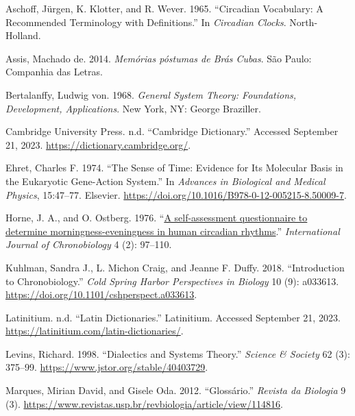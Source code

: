 \documentclass[
  12pt,
  a4paper,
  oneside]{tesesusp}
\newlength{\cslhangindent}
\newlength{\cslentryspacingunit} %
\newenvironment{CSLReferences}[2] %
 {%
  \setlength{\parindent}{0pt}
  \ifodd #1
  \let\oldpar\par
  \def\par{\hangindent=\cslhangindent\oldpar}
  \fi
  \setlength{\parskip}{#2\cslentryspacingunit}
 }%
 {}
\begin{document}
\hypertarget{refs}{}
\begin{CSLReferences}{1}{0}
\leavevmode{}%
Aschoff, Jürgen, K. Klotter, and R. Wever. 1965. {``Circadian
Vocabulary: A Recommended Terminology with Definitions.''} In
\emph{Circadian Clocks}. North-Holland.

\leavevmode{}%
Assis, Machado de. 2014. \emph{Memórias póstumas de Brás Cubas}. São
Paulo: Companhia das Letras.

\leavevmode{}%
Bertalanffy, Ludwig von. 1968. \emph{General System Theory: Foundations,
Development, Applications}. New York, NY: George Braziller.

\leavevmode{}%
Cambridge University Press. n.d. {``Cambridge Dictionary.''} Accessed
September 21, 2023. \url{https://dictionary.cambridge.org/}.

\leavevmode{}%
Ehret, Charles F. 1974. {``The Sense of Time: Evidence for Its Molecular
Basis in the Eukaryotic Gene-Action System.''} In \emph{Advances in
Biological and Medical Physics}, 15:47--77. Elsevier.
\url{https://doi.org/10.1016/B978-0-12-005215-8.50009-7}.

\leavevmode{}%
Horne, J. A., and O. Ostberg. 1976.
{``\href{https://www.ncbi.nlm.nih.gov/pubmed/1027738}{A self-assessment
questionnaire to determine morningness-eveningness in human circadian
rhythms}.''} \emph{International Journal of Chronobiology} 4 (2):
97--110.

\leavevmode{}%
Kuhlman, Sandra J., L. Michon Craig, and Jeanne F. Duffy. 2018.
{``Introduction to Chronobiology.''} \emph{Cold Spring Harbor
Perspectives in Biology} 10 (9): a033613.
\url{https://doi.org/10.1101/cshperspect.a033613}.

\leavevmode{}%
Latinitium. n.d. {``Latin Dictionaries.''} Latinitium. Accessed
September 21, 2023. \url{https://latinitium.com/latin-dictionaries/}.

\leavevmode{}%
Levins, Richard. 1998. {``Dialectics and Systems Theory.''}
\emph{Science \& Society} 62 (3): 375--99.
\url{https://www.jstor.org/stable/40403729}.

\leavevmode{}%
Marques, Mirian David, and Gisele Oda. 2012. {``Glossário.''}
\emph{Revista da Biologia} 9 (3).
\url{https://www.revistas.usp.br/revbiologia/article/view/114816}.


\end{CSLReferences}
\end{document}
